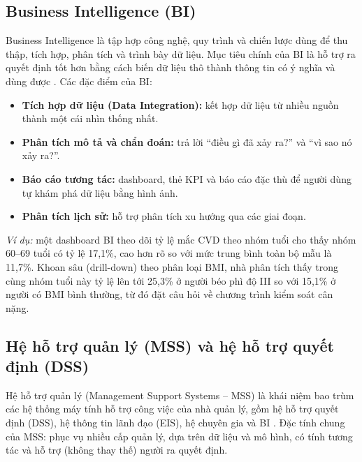 \subsection{Business Intelligence (BI)}
Business Intelligence là tập hợp công nghệ, quy trình và chiến lược dùng để thu thập, tích hợp, phân tích và trình bày dữ liệu. Mục tiêu chính của BI là hỗ trợ ra quyết định tốt hơn bằng cách biến dữ liệu thô thành thông tin có ý nghĩa và dùng được \cite{han2012}. Các đặc điểm của BI:
\begin{itemize}
\item \textbf{Tích hợp dữ liệu (Data Integration):} kết hợp dữ liệu từ nhiều nguồn thành một cái nhìn thống nhất.
\item \textbf{Phân tích mô tả và chẩn đoán:} trả lời ``điều gì đã xảy ra?'' và ``vì sao nó xảy ra?''.
\item \textbf{Báo cáo tương tác:} dashboard, thẻ KPI và báo cáo đặc thù để người dùng tự khám phá dữ liệu bằng hình ảnh.
\item \textbf{Phân tích lịch sử:} hỗ trợ phân tích xu hướng qua các giai đoạn.
\end{itemize}
\emph{Ví dụ:} một dashboard BI theo dõi tỷ lệ mắc CVD theo nhóm tuổi cho thấy nhóm 60--69 tuổi có tỷ lệ 17,1\%, cao hơn rõ so với mức trung bình toàn bộ mẫu là 11,7\%. Khoan sâu (drill-down) theo phân loại BMI, nhà phân tích thấy trong cùng nhóm tuổi này tỷ lệ lên tới 25,3\% ở người béo phì độ III so với 15,1\% ở người có BMI bình thường, từ đó đặt câu hỏi về chương trình kiểm soát cân nặng.

\subsection{Hệ hỗ trợ quản lý (MSS) và hệ hỗ trợ quyết định (DSS)}
Hệ hỗ trợ quản lý (Management Support Systems -- MSS) là khái niệm bao trùm các hệ thống máy tính hỗ trợ công việc của nhà quản lý, gồm hệ hỗ trợ quyết định (DSS), hệ thông tin lãnh đạo (EIS), hệ chuyên gia và BI \cite{turban2005}. Đặc tính chung của MSS: phục vụ nhiều cấp quản lý, dựa trên dữ liệu và mô hình, có tính tương tác và hỗ trợ (không thay thế) người ra quyết định.

